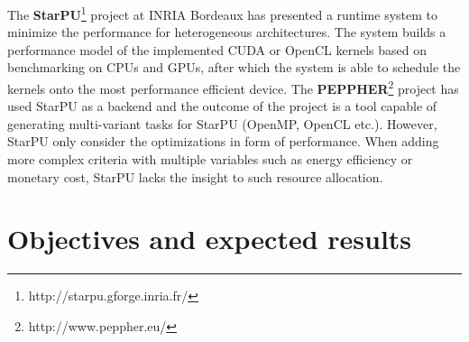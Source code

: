 \documentclass{article}
\begin{document}
The \textbf{StarPU}\footnote{http://starpu.gforge.inria.fr/} project at INRIA Bordeaux has presented a runtime system to minimize the performance for heterogeneous architectures. 
The system builds a performance model of the implemented CUDA or OpenCL kernels based on benchmarking on CPUs and GPUs, after which the system is able to schedule the kernels onto the most performance efficient device. 
The \textbf{PEPPHER}\footnote{http://www.peppher.eu/} project has used StarPU as a backend and the outcome of the project is a tool capable of generating multi-variant tasks for StarPU (OpenMP, OpenCL etc.). 
However, StarPU only consider the optimizations in form of performance. 
When adding more complex criteria with multiple variables such as energy efficiency or monetary cost, StarPU lacks the insight to such resource allocation.

\section{Objectives and expected results}
\end{document}
